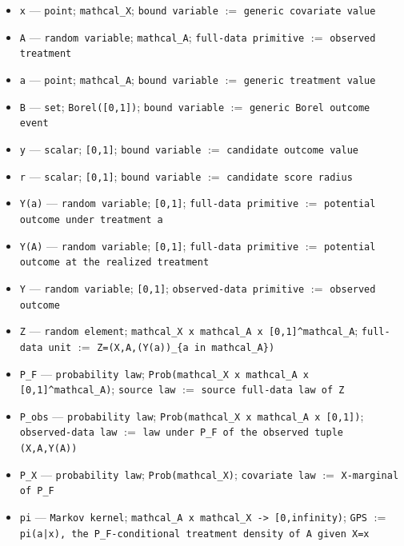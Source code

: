 \documentclass{article}
\begin{document}
\begin{itemize}
  \item \texttt{x} --- \texttt{point}; \texttt{mathcal\_X}; \texttt{bound variable} $:=$ \texttt{generic covariate value}
  \item \texttt{A} --- \texttt{random variable}; \texttt{mathcal\_A}; \texttt{full-data primitive} $:=$ \texttt{observed treatment}
  \item \texttt{a} --- \texttt{point}; \texttt{mathcal\_A}; \texttt{bound variable} $:=$ \texttt{generic treatment value}
  \item \texttt{B} --- \texttt{set}; \texttt{Borel([0,1])}; \texttt{bound variable} $:=$ \texttt{generic Borel outcome event}
  \item \texttt{y} --- \texttt{scalar}; \texttt{[0,1]}; \texttt{bound variable} $:=$ \texttt{candidate outcome value}
  \item \texttt{r} --- \texttt{scalar}; \texttt{[0,1]}; \texttt{bound variable} $:=$ \texttt{candidate score radius}
  \item \texttt{Y(a)} --- \texttt{random variable}; \texttt{[0,1]}; \texttt{full-data primitive} $:=$ \texttt{potential outcome under treatment a}
  \item \texttt{Y(A)} --- \texttt{random variable}; \texttt{[0,1]}; \texttt{full-data primitive} $:=$ \texttt{potential outcome at the realized treatment}
  \item \texttt{Y} --- \texttt{random variable}; \texttt{[0,1]}; \texttt{observed-data primitive} $:=$ \texttt{observed outcome}
  \item \texttt{Z} --- \texttt{random element}; \texttt{mathcal\_X x mathcal\_A x [0,1]\textasciicircum{}mathcal\_A}; \texttt{full-data unit} $:=$ \texttt{Z=(X,A,(Y(a))\_\{a in mathcal\_A\})}
  \item \texttt{P\_F} --- \texttt{probability law}; \texttt{Prob(mathcal\_X x mathcal\_A x [0,1]\textasciicircum{}mathcal\_A)}; \texttt{source law} $:=$ \texttt{source full-data law of Z}
  \item \texttt{P\_obs} --- \texttt{probability law}; \texttt{Prob(mathcal\_X x mathcal\_A x [0,1])}; \texttt{observed-data law} $:=$ \texttt{law under P\_F of the observed tuple (X,A,Y(A))}
  \item \texttt{P\_X} --- \texttt{probability law}; \texttt{Prob(mathcal\_X)}; \texttt{covariate law} $:=$ \texttt{X-marginal of P\_F}
  \item \texttt{pi} --- \texttt{Markov kernel}; \texttt{mathcal\_A x mathcal\_X -> [0,infinity)}; \texttt{GPS} $:=$ \texttt{pi(a|x), the P\_F-conditional treatment density of A given X=x}

\end{itemize}
\end{document}

